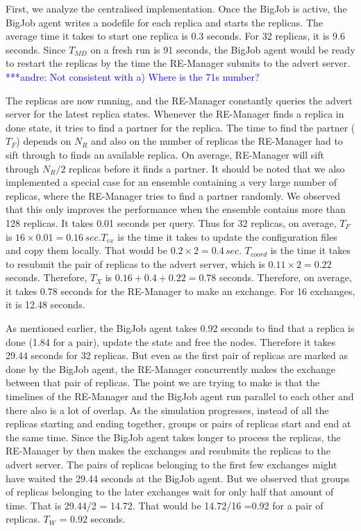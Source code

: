 \documentclass{rspublic}
\newcommand{\alnote}[1]{ {\textcolor{blue} { ***andre: #1 }}}
\newcommand{\alnote}[1]{}
\begin{document}
First, we analyze the centralised implementation.  Once the BigJob is active, 
the BigJob agent writes a nodefile for
each replica and starts the replicas. The average time it takes to
start one replica is 0.3 seconds. For 32 replicas, it is 9.6
seconds. Since $T_{MD}$ on a fresh run is 91 seconds, the BigJob agent
would be ready to restart the replicas by the time the RE-Manager
submits to the advert server. \alnote{Not consistent with a) 
Where is the 71s number?}

The replicas are now running, and the RE-Manager constantly
queries the advert server for the latest replica states. Whenever the
RE-Manager finds a replica in done state, it tries to find a partner
for the replica. The time to find the partner ($T_F$)
depends on $N_R$ and also on the number of replicas the RE-Manager had
to sift through to finds an available replica. On average, RE-Manager
will sift through $N_R/2$ replicas before it finds a partner. It
should be noted that we also implemented a special case for an ensemble containing a very large
number of replicas, where the RE-Manager tries to find a
partner randomly. We observed that this only improves the performance
when the ensemble contains more than 128 replicas. It takes 0.01
seconds per query. Thus for 32 replicas, on average, $T_F$ is
$16\times 0.01=0.16\,sec. T_{ex}$ is the time it takes to update
the configuration files and copy them locally. That would be
$0.2\times 2=0.4\,sec.$ $T_{coord}$ is the time it takes to
resubmit the pair of replicas to the advert server, which is
$0.11\times 2 = 0.22$ seconds. Therefore, $T_X$ is
$0.16+0.4+0.22=0.78$ seconds. Therefore, on average, it takes 0.78
seconds for the RE-Manager to make an exchange. For 16 exchanges, it
is 12.48 seconds.

As mentioned earlier, the BigJob agent takes 0.92 seconds to find that
a replica is done (1.84 for a pair), update the state and free the
nodes. Therefore it takes 29.44 seconds for 32 replicas. But even as
the first pair of replicas are marked as done by the BigJob agent, the
RE-Manager concurrently makes the exchange between that pair of
replicas. The point we are trying to make is that the timelines of the
RE-Manager and the BigJob agent run parallel to each other and there
also is a lot of overlap.  As the simulation progresses, instead of
all the replicas starting and ending together, groups or pairs of
replicas start and end at the same time.  Since the BigJob agent takes
longer to process the replicas, the RE-Manager by then makes the
exchanges and resubmits the replicas to the advert server. The pairs
of replicas belonging to the first few exchanges might have waited the
29.44 seconds at the BigJob agent. But we observed that groups of
replicas belonging to the later exchanges wait for only half that
amount of time. That is 29.44/2 = 14.72. That would be 14.72/16 =0.92
for a pair of replicas. $T_W$ = 0.92 seconds.
\end{document}
